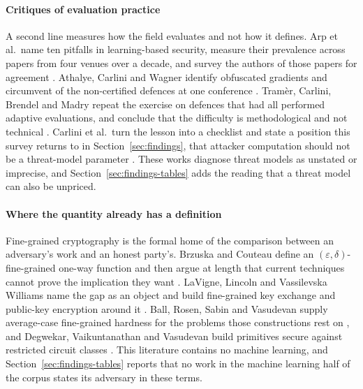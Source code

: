 \paragraph{Critiques of evaluation practice}
A second line measures how the field evaluates and not how it defines. Arp et
al.\ name ten pitfalls in learning-based security, measure their prevalence
across \DDpapers{} papers from four venues over a decade, and survey the authors
of those papers for agreement \cite{AQPWPWCR22}. Athalye, Carlini and Wagner
identify obfuscated gradients and circumvent \OGobfuscated{} of the
\OGpopulation{} non-certified defences at one conference \cite{ACW18}. Tram\`er,
Carlini, Brendel and Madry repeat the exercise on \AAdefences{} defences that
had all performed adaptive evaluations, and conclude that the difficulty is
methodological and not technical \cite{TCBM20}. Carlini et al.\ turn the lesson
into a checklist and state a position this survey returns to in
Section~\ref{sec:findings}, that attacker computation should not be a
threat-model parameter \cite{CAPBRTGMK19}. These works diagnose threat models as
unstated or imprecise, and Section~\ref{sec:findings-tables} adds the reading
that a threat model can also be unpriced.

\paragraph{Where the quantity already has a definition}
Fine-grained cryptography is the formal home of the comparison between an
adversary's work and an honest party's. Brzuska and Couteau define an
$(\varepsilon,\delta)$-fine-grained one-way function and then argue at length
that current techniques cannot prove the implication they want \cite{BC22}.
LaVigne, Lincoln and Vassilevska Williams name the gap as an object and build
fine-grained key exchange and public-key encryption around it \cite{LLW19}.
Ball, Rosen, Sabin and Vasudevan supply average-case fine-grained hardness for
the problems those constructions rest on \cite{BRSV17}, and Degwekar,
Vaikuntanathan and Vasudevan build primitives secure against restricted circuit
classes \cite{DVV16}. This literature contains no machine learning, and
Section~\ref{sec:findings-tables} reports that no work in the machine learning
half of the corpus states its adversary in these terms.

